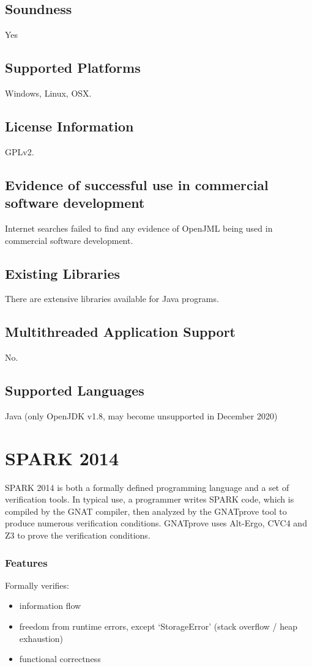 \documentclass[12pt,openany,a4paper]{book}
\begin{document}
	\subsection{Soundness}
	Yes
	\subsection{Supported Platforms}
	Windows, Linux, OSX.
	\subsection{License Information}
		GPLv2.
	\subsection{Evidence of successful use in commercial software development} 
		Internet searches failed to find any evidence of OpenJML being used in commercial software development. 

	\subsection{Existing Libraries} 
		There are extensive libraries available for Java programs.
	\subsection{Multithreaded Application Support}
	No.
	\subsection{Supported Languages}
	Java (only OpenJDK v1.8, may become unsupported in December 2020)

\section{SPARK 2014}
	SPARK 2014 is both a formally defined programming language and a set of verification tools. In typical use, a programmer writes SPARK code, which is compiled by the GNAT compiler, then analyzed by the GNATprove tool to produce numerous verification conditions. GNATprove uses Alt-Ergo, CVC4 and Z3 to prove the verification conditions.

	\subsubsection{Features}
	Formally verifies:
	\begin{itemize}
		\item information flow
		\item freedom from runtime errors, except `StorageError' (stack overflow / heap exhaustion)
		\item functional correctness
	\end{itemize}
\end{document}
